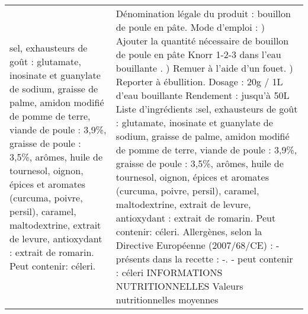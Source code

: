\begin{tabular}{p{7cm}p{7cm}}
                                                                                                           sel, exhausteurs de goût : glutamate, inosinate et guanylate de sodium, graisse de palme, amidon modifié de pomme de terre, viande de poule : 3,9\%, graisse de poule : 3,5\%, arômes, huile de tournesol, oignon, épices et aromates (curcuma, poivre, persil), caramel, maltodextrine, extrait de levure, antioxydant : extrait de romarin. Peut contenir: céleri. &  Dénomination légale du produit : bouillon de poule en pâte.  \newline   \newline Mode d’emploi :   \newline 1) Ajouter la quantité nécessaire de bouillon de poule en pâte Knorr 1-2-3 dans l’eau bouillante .  \newline 2) Remuer à l’aide d’un fouet.   \newline 3) Reporter à ébullition.  \newline   \newline Dosage :  20g / 1L d’eau bouillante                                                                  Rendement : jusqu’à 50L  \newline   \newline Liste  d’ingrédients  :sel, exhausteurs de goût : glutamate, inosinate et guanylate de sodium, graisse de palme,  \newline amidon modifié de pomme de terre, viande de poule : 3,9\%, graisse de poule : 3,5\%, arômes, huile de tournesol,  \newline oignon,  épices  et  aromates  (curcuma,  poivre,  persil),  caramel,  maltodextrine,  extrait  de  levure,  antioxydant  :  \newline extrait de romarin. Peut contenir: céleri.  \newline   \newline Allergènes, selon la Directive Européenne (2007/68/CE) :  \newline - présents dans la recette : -.  \newline - peut contenir : céleri  \newline   \newline  INFORMATIONS NUTRITIONNELLES  \newline   \newline   \newline   \newline   \newline Valeurs nutritionnelles moyennes  \newline   \newline 
\end{tabular}
